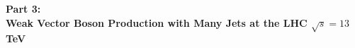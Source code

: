\vspace*{60 mm}
\begin{center}
{\Huge{\textbf{Part 3:}}}\\
\vspace*{5 mm}
{\Huge{\textbf{Weak Vector Boson Production with Many Jets at the LHC $\sqrt{s}=13$ TeV}}}
\end{center}